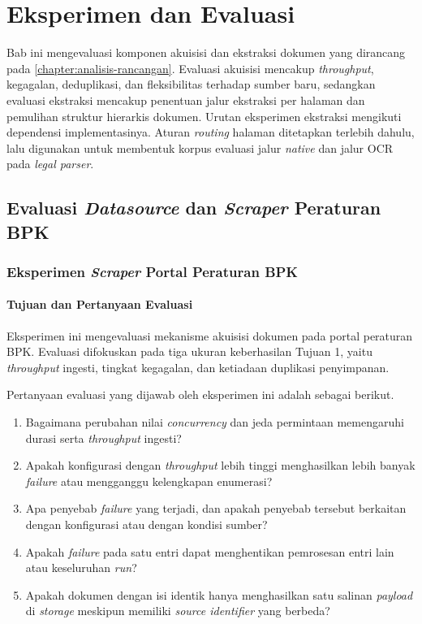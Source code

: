 \chapter{Eksperimen dan Evaluasi}
\label{chapter:eksperimen-evaluasi}

Bab ini mengevaluasi komponen akuisisi dan ekstraksi dokumen yang dirancang pada \autoref{chapter:analisis-rancangan}.
Evaluasi akuisisi mencakup \textit{throughput}, kegagalan, deduplikasi, dan fleksibilitas terhadap sumber baru, sedangkan evaluasi ekstraksi mencakup penentuan jalur ekstraksi per halaman dan pemulihan struktur hierarkis dokumen.
Urutan eksperimen ekstraksi mengikuti dependensi implementasinya.
Aturan \textit{routing} halaman ditetapkan terlebih dahulu, lalu digunakan untuk membentuk korpus evaluasi jalur \textit{native} dan jalur OCR pada \textit{legal parser}.

\section{Evaluasi \textit{Datasource} dan \textit{Scraper} Peraturan BPK}
\label{sec:evaluasi-datasource-scraper-bpk}

\subsection{Eksperimen \textit{Scraper} Portal Peraturan BPK}
\label{sec:eksperimen-scraper-bpk}

\subsubsection{Tujuan dan Pertanyaan Evaluasi}
\label{sec:tujuan-evaluasi-scraper-bpk}

Eksperimen ini mengevaluasi mekanisme akuisisi dokumen pada portal peraturan BPK.
Evaluasi difokuskan pada tiga ukuran keberhasilan Tujuan 1, yaitu \textit{throughput} ingesti, tingkat kegagalan, dan ketiadaan duplikasi penyimpanan.

Pertanyaan evaluasi yang dijawab oleh eksperimen ini adalah sebagai berikut.

\begin{enumerate}
  \item Bagaimana perubahan nilai \textit{concurrency} dan jeda permintaan memengaruhi durasi serta \textit{throughput} ingesti?
  \item Apakah konfigurasi dengan \textit{throughput} lebih tinggi menghasilkan lebih banyak \textit{failure} atau mengganggu kelengkapan enumerasi?
  \item Apa penyebab \textit{failure} yang terjadi, dan apakah penyebab tersebut berkaitan dengan konfigurasi atau dengan kondisi sumber?
  \item Apakah \textit{failure} pada satu entri dapat menghentikan pemrosesan entri lain atau keseluruhan \textit{run}?
  \item Apakah dokumen dengan isi identik hanya menghasilkan satu salinan \textit{payload} di \textit{storage} meskipun memiliki \textit{source identifier} yang berbeda?
\end{enumerate}

